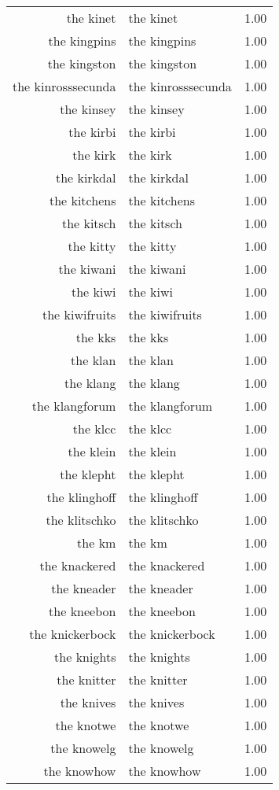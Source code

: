 \begin{table}[ht]
\begin{tabular}{rlr}
  the kinet & the kinet & 1.00 \\ 
  the kingpins & the kingpins & 1.00 \\ 
  the kingston & the kingston & 1.00 \\ 
  the kinrosssecunda & the kinrosssecunda & 1.00 \\ 
  the kinsey & the kinsey & 1.00 \\ 
  the kirbi & the kirbi & 1.00 \\ 
  the kirk & the kirk & 1.00 \\ 
  the kirkdal & the kirkdal & 1.00 \\ 
  the kitchens & the kitchens & 1.00 \\ 
  the kitsch & the kitsch & 1.00 \\ 
  the kitty & the kitty & 1.00 \\ 
  the kiwani & the kiwani & 1.00 \\ 
  the kiwi & the kiwi & 1.00 \\ 
  the kiwifruits & the kiwifruits & 1.00 \\ 
  the kks & the kks & 1.00 \\ 
  the klan & the klan & 1.00 \\ 
  the klang & the klang & 1.00 \\ 
  the klangforum & the klangforum & 1.00 \\ 
  the klcc & the klcc & 1.00 \\ 
  the klein & the klein & 1.00 \\ 
  the klepht & the klepht & 1.00 \\ 
  the klinghoff & the klinghoff & 1.00 \\ 
  the klitschko & the klitschko & 1.00 \\ 
  the km & the km & 1.00 \\ 
  the knackered & the knackered & 1.00 \\ 
  the kneader & the kneader & 1.00 \\ 
  the kneebon & the kneebon & 1.00 \\ 
  the knickerbock & the knickerbock & 1.00 \\ 
  the knights & the knights & 1.00 \\ 
  the knitter & the knitter & 1.00 \\ 
  the knives & the knives & 1.00 \\ 
  the knotwe & the knotwe & 1.00 \\ 
  the knowelg & the knowelg & 1.00 \\ 
  the knowhow & the knowhow & 1.00 \\ 

\end{tabular}
\end{table}
